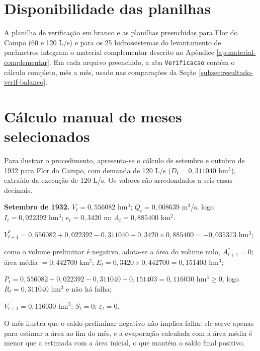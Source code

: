\section{Disponibilidade das planilhas}

A planilha de verificação em branco e as planilhas preenchidas para Flor do Campo (60 e 120 L/s) e para os 25 hidrossistemas do levantamento de parâmetros integram o material complementar descrito no Apêndice \ref{ap:material-complementar}. Em cada arquivo preenchido, a aba \texttt{Verificacao} contém o cálculo completo, mês a mês, usado nas comparações da Seção \ref{subsec:resultado-verif-balanco}.

\section{Cálculo manual de meses selecionados}

Para ilustrar o procedimento, apresenta-se o cálculo de setembro e outubro de 1932 para Flor do Campo, com demanda de 120 L/s ($D_t = 0{,}311040$ hm$^3$), extraído da execução de 120 L/s. Os valores são arredondados a seis casas decimais.

\textbf{Setembro de 1932.} $V_t = 0{,}556082$ hm$^3$; $Q_t = 0{,}008639$ m$^3$/s, logo $I_t = 0{,}022392$ hm$^3$; $e_t = 0{,}3420$ m; $A_t = 0{,}885400$ km$^2$.
\begin{alineas}
    \item $V^{*}_{t+1} = 0{,}556082 + 0{,}022392 - 0{,}311040 - 0{,}3420 \times 0{,}885400 = -0{,}035373$ hm$^3$;
    \item como o volume preliminar é negativo, adota-se a área do volume nulo, $A^{*}_{t+1} = 0$; área média $= 0{,}442700$ km$^2$; $E_t = 0{,}3420 \times 0{,}442700 = 0{,}151403$ hm$^3$;
    \item $P_t = 0{,}556082 + 0{,}022392 - 0{,}311040 - 0{,}151403 = 0{,}116030$ hm$^3 \geq 0$, logo $R_t = 0{,}311040$ hm$^3$ e não há falha;
    \item $V_{t+1} = 0{,}116030$ hm$^3$; $S_t = 0$; $\varepsilon_t = 0$.
\end{alineas}

O mês ilustra que o saldo preliminar negativo não implica falha: ele serve apenas para estimar a área ao fim do mês, e a evaporação calculada com a área média é menor que a estimada com a área inicial, o que mantém o saldo final positivo.


